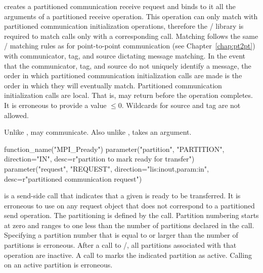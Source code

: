  creates a partitioned communication receive request
and binds to it all the
arguments of a partitioned receive operation.
This operation can only match with partitioned communication initialization operations,
therefore the \MPI/ library is required to match  calls only with a corresponding
 call. 
Matching follows the same \MPI/ matching rules as for point-to-point communication (see Chapter~\ref{chap:pt2pt}) with communicator, tag, and source dictating
message matching. In the event that the communicator, tag, and source do not
uniquely identify a message, the order in which partitioned 
communication initialization calls are made
is the order in which they will eventually match.
Partitioned communication initialization calls are
local. That is,  may return before the operation
completes. It is erroneous to provide a  value $\le 0$. Wildcards for source and tag are not allowed.

\begin{implementors}
Unlike ,  may communicate.
Also unlike ,  takes an  argument.
\end{implementors}

\begin{mpi-binding}
    function_name("MPI_Pready")
    parameter("partition", "PARTITION", direction="IN", desc=r"partition to mark ready for transfer")
    parameter("request", "REQUEST", direction="lis:inout,param:in", desc=r"partitioned communication request")
\end{mpi-binding}

 is a send-side call that indicates that a given  is ready to be
transferred.  It is erroneous to use  on any request object that does not correspond to a partitioned send operation.
The partitioning is defined by the  call.
Partition numbering starts at zero and ranges to one less than the number of partitions declared in
the  call.  
Specifying a partition number that is equal to or larger than the number of partitions is erroneous.
After a call to /, all partitions associated with that operation are inactive. A call to
 marks the indicated partition as active. 
Calling  on an active partition is erroneous.

